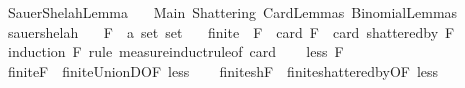 %
\begin{isabellebody}%
%
%
\isadelimdocument
%
\endisadelimdocument
%
\isatagdocument
%
\isamarkuptrue%
%
\endisatagdocument
{\isafolddocument}%
%
\isadelimdocument
%
\endisadelimdocument
%
\isadelimtheory
%
\endisadelimtheory
%
\isatagtheory
{}\isamarkupfalse%
\ Sauer{\isacharunderscore}{\kern0pt}Shelah{\isacharunderscore}{\kern0pt}Lemma\isanewline
\ \ \ Main\ Shattering\ Card{\isacharunderscore}{\kern0pt}Lemmas\ Binomial{\isacharunderscore}{\kern0pt}Lemmas\isanewline
{}%
\endisatagtheory
{\isafoldtheory}%
%
\isadelimtheory
%
\endisadelimtheory
%
\isadelimdocument
%
\endisadelimdocument
%
\isatagdocument
%
\isamarkuptrue%
%
\endisatagdocument
{\isafolddocument}%
%
\isadelimdocument
%
\endisadelimdocument
{}\isamarkupfalse%
\ sauer{\isacharunderscore}{\kern0pt}shelah{\isacharunderscore}{\kern0pt}{}{\isacharcolon}{\kern0pt}\isanewline
\ \ \ F\ {\isacharcolon}{\kern0pt}{\isacharcolon}{\kern0pt}\ {\isachardoublequoteopen}{\isacharprime}{\kern0pt}a\ set\ set{\isachardoublequoteclose}\isanewline
\ \ \ {\isachardoublequoteopen}finite\ {\isacharparenleft}{\kern0pt}{\isasymUnion}\ F{\isacharparenright}{\kern0pt}\ {\isasymLongrightarrow}\ card\ F\ {\isasymle}\ card\ {\isacharparenleft}{\kern0pt}shattered{\isacharunderscore}{\kern0pt}by\ F{\isacharparenright}{\kern0pt}{\isachardoublequoteclose}\isanewline
%
\isadelimproof
%
\endisadelimproof
%
\isatagproof
{}\isamarkupfalse%
\ {\isacharparenleft}{\kern0pt}induction\ F\ rule{\isacharcolon}{\kern0pt}\ measure{\isacharunderscore}{\kern0pt}induct{\isacharunderscore}{\kern0pt}rule{\isacharbrackleft}{\kern0pt}of\ {\isachardoublequoteopen}card{\isachardoublequoteclose}{\isacharbrackright}{\kern0pt}{\isacharparenright}{\kern0pt}\isanewline
\ \ \isamarkupfalse%
\ {\isacharparenleft}{\kern0pt}less\ F{\isacharparenright}{\kern0pt}\isanewline
\ \ \isamarkupfalse%
\ finite{\isacharunderscore}{\kern0pt}F\ {\isacharequal}{\kern0pt}\ finite{\isacharunderscore}{\kern0pt}UnionD{\isacharbrackleft}{\kern0pt}OF\ less{\isacharparenleft}{\kern0pt}{}{\isacharparenright}{\kern0pt}{\isacharbrackright}{\kern0pt}\isanewline
\ \ \isamarkupfalse%
\ finite{\isacharunderscore}{\kern0pt}shF\ {\isacharequal}{\kern0pt}\ finite{\isacharunderscore}{\kern0pt}shattered{\isacharunderscore}{\kern0pt}by{\isacharbrackleft}{\kern0pt}OF\ less{\isacharparenleft}{\kern0pt}{}{\isacharparenright}{\kern0pt}{\isacharbrackright}{\kern0pt}\isanewline

\end{isabellebody}
